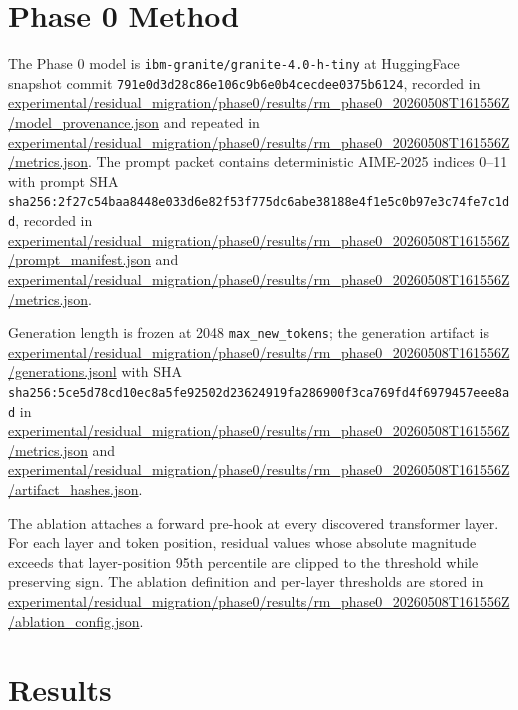 \documentclass{article}
\begin{document}
\section{Phase 0 Method}

The Phase 0 model is \texttt{ibm-granite/granite-4.0-h-tiny} at HuggingFace
snapshot commit
\texttt{791e0d3d28c86e106c9b6e0b4cecdee0375b6124}, recorded in
\url{experimental/residual_migration/phase0/results/rm_phase0_20260508T161556Z/model_provenance.json}
and repeated in
\url{experimental/residual_migration/phase0/results/rm_phase0_20260508T161556Z/metrics.json}.
The prompt packet contains deterministic AIME-2025 indices 0--11 with prompt
SHA
\texttt{sha256:2f27c54baa8448e033d6e82f53f775dc6abe38188e4f1e5c0b97e3c74fe7c1dd},
recorded in
\url{experimental/residual_migration/phase0/results/rm_phase0_20260508T161556Z/prompt_manifest.json}
and
\url{experimental/residual_migration/phase0/results/rm_phase0_20260508T161556Z/metrics.json}.

Generation length is frozen at 2048 \texttt{max\_new\_tokens}; the generation
artifact is \url{experimental/residual_migration/phase0/results/rm_phase0_20260508T161556Z/generations.jsonl}
with SHA
\texttt{sha256:5ce5d78cd10ec8a5fe92502d23624919fa286900f3ca769fd4f6979457eee8ad}
in
\url{experimental/residual_migration/phase0/results/rm_phase0_20260508T161556Z/metrics.json}
and
\url{experimental/residual_migration/phase0/results/rm_phase0_20260508T161556Z/artifact_hashes.json}.

The ablation attaches a forward pre-hook at every discovered transformer layer.
For each layer and token position, residual values whose absolute magnitude
exceeds that layer-position 95th percentile are clipped to the threshold while
preserving sign. The ablation definition and per-layer thresholds are stored in
\url{experimental/residual_migration/phase0/results/rm_phase0_20260508T161556Z/ablation_config.json}.

\section{Results}
\end{document}
